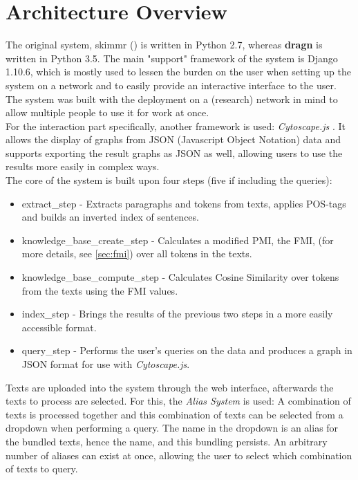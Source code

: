 \section{Architecture Overview}\label{overview}
The original system, skimmr (\cite{novavcek2014skimmr}) is written in Python 2.7, whereas \textbf{dragn} is written in Python 3.5. The main "support" framework of the system is Django 1.10.6, which is mostly used to lessen the burden on the user when setting up the system on a network and to easily provide an interactive interface to the user. The system was built with the deployment on a (research) network in mind to allow multiple people to use it for work at once.\\
For the interaction part specifically, another framework is used: \textit{Cytoscape.js} \cite{doi:10.1093/bioinformatics/btv557}. It allows the display of graphs from JSON (Javascript Object Notation) data and supports exporting the result graphs as JSON as well, allowing users to use the results more easily in complex ways.\\
The core of the system is built upon four steps (five if including the queries):
\begin{itemize}
    \item extract\_step - Extracts paragraphs and tokens from texts, applies POS-tags and builds an inverted index of sentences.
    \item knowledge\_base\_create\_step - Calculates a modified PMI, the FMI, (for more details, see \ref{sec:fmi}) over all tokens in the texts.
    \item knowledge\_base\_compute\_step - Calculates Cosine Similarity over tokens from the texts using the FMI values.
    \item index\_step - Brings the results of the previous two steps in a more easily accessible format.
    \item query\_step - Performs the user's queries on the data and produces a graph in JSON format for use with \textit{Cytoscape.js}.
\end{itemize}
Texts are uploaded into the system through the web interface, afterwards the texts to process are selected. For this, the \textit{Alias System} is used: A combination of texts is processed together and this combination of texts can be selected from a dropdown when performing a query. The name in the dropdown is an alias for the bundled texts, hence the name, and this bundling persists. An arbitrary number of aliases can exist at once, allowing the user to select which combination of texts to query.\\
